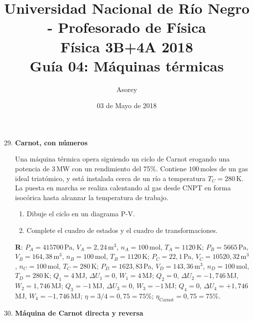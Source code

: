 \documentclass[a4paper,12pt]{article}
\begin{document}
\title{
{\normalsize{Universidad Nacional de Río Negro - Profesorado de Física}}\\
Física 3B+4A  2018 \\ Guía 04: Máquinas térmicas
}
\author{Asorey}
\date{03 de Mayo de 2018} 
\maketitle

\begin{enumerate}
	\setcounter{enumi}{28}      %

	\item {\bf{Carnot, con números}}

		Una máquina térmica opera siguiendo un ciclo de Carnot erogando una
		potencia de $3$\,MW con un rendimiento del 75\%.  Contiene $100$\,moles de
		un gas ideal triatómico, y está instalada cerca de un río a temperatura
		$T_C=280$\,K. La puesta en marcha se realiza calentando al gas desde
		CNPT en forma isocórica hasta alcanzar la temperatura de trabajo.
		\begin{enumerate}
			\item Dibuje el ciclo en un diagrama P-V.
			\item Complete el cuadro de estados y el cuadro de transformaciones.
		\end{enumerate}
		{\bf{R}}:  
		$P_A=415700$\,Pa, $V_A=2,24$\,m$^3$, $n_A=100$\,mol, $T_A=1120$\,K; 
		$P_B=5665$\,Pa, $V_B=164,38$\,m$^3$, $n_B=100$\,mol, $T_B=1120$\,K; 
		$P_C=22,1$\,Pa, $V_C=10520,32$\,m$^3$, $n_C=100$\,mol, $T_C=280$\,K; 
		$P_D=1623,83$\,Pa, $V_D=143,36$\,m$^3$, $n_D=100$\,mol, $T_D=280$\,K; 
		$Q_1=4$\,MJ, $\Delta U_1=0$, $W_1=4$\,MJ;
		$Q_2=0$, $\Delta U_2=-1,746$\,MJ, $W_2=1,746$\,MJ;
		$Q_3=-1$\,MJ, $\Delta U_3=0$, $W_3=-1$\,MJ;
		$Q_4=0$, $\Delta U_4=+1,746$\,MJ, $W_4=-1,746$\,MJ;
		$\eta=3/4 = 0,75 = 75\%$; $\eta_{\mathrm{Carnot}} = 0,75 = 75\%$.
	
	\item {\bf{Máquina de Carnot directa y reversa}}
		

\end{enumerate}
\end{document}
